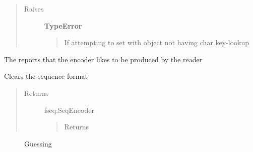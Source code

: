 \documentclass[letterpaper,10pt,english]{sphinxmanual}
\begin{document}
\begin{fulllineitems}
\begin{fulllineitems}
\begin{quote}
\begin{description}
\item[{Raises}] \leavevmode
\textbf{TypeError}
\begin{quote}

If attempting to set with object not having char key-lookup
\end{quote}

\end{description}\end{quote}

\end{fulllineitems}


\begin{fulllineitems}
\label{fseq.reading:fseq.reading.seq_encoder.SeqEncoder.requestReports}
The reports that the encoder likes to be produced by the reader

\end{fulllineitems}


\begin{fulllineitems}
\label{fseq.reading:fseq.reading.seq_encoder.SeqEncoder.reset}
Clears the sequence format
\begin{quote}\begin{description}
\item[{Returns}] \leavevmode
fseq.SeqEncoder
\begin{quote}

Returns 
\end{quote}

\end{description}\end{quote}



\begin{description}
\item[{{\hyperref[fseq.reading:fseq.reading.seq_encoder.SeqEncoder.detectFormat]{}}}] \leavevmode
Guessing

\end{description}



\end{fulllineitems}



\end{fulllineitems}
\end{document}
